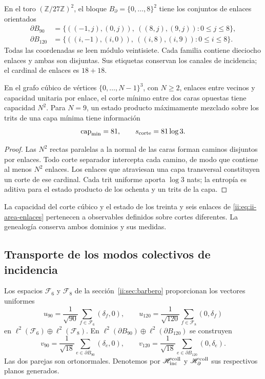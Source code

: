 En el toro \((\mathbb Z/27\mathbb Z)^2\), el bloque
\(B_\partial=\{0,\ldots,8\}^2\) tiene los conjuntos de enlaces
orientados
\begin{align}
 \partial B_{90}
 &=\{((-1,j),(0,j)),\ ((8,j),(9,j)):0\le j\le8\},\\
 \partial B_{120}
 &=\{((i,-1),(i,0)),\ ((i,8),(i,9)):0\le i\le8\}.
 \label{ii:eq:ii-area-enlaces}
\end{align}
Todas las coordenadas se leen módulo veintisiete. Cada familia contiene
dieciocho enlaces y ambas son disjuntas. Sus etiquetas conservan los
canales de incidencia; el cardinal de enlaces es \(18+18\).

\begin{theorem}
\label{ii:thm:ii-area-corte-minimo}
En el grafo cúbico de vértices \(\{0,\ldots,N-1\}^3\), con
\(N\ge2\), enlaces entre vecinos y capacidad unitaria por enlace,
el corte mínimo entre dos caras opuestas tiene capacidad \(N^2\).
Para \(N=9\), un estado producto máximamente mezclado sobre los
trits de una capa mínima tiene información
\begin{equation}
 \operatorname{cap}_{\min}=81,\qquad s_{\rm corte}=81\log3.
 \label{ii:eq:ii-area-corte-informacion}
\end{equation}
\end{theorem}
\begin{proof}
Las \(N^2\) rectas paralelas a la normal de las caras forman caminos
disjuntos por enlaces. Todo corte separador intercepta cada camino, de
modo que contiene al menos \(N^2\) enlaces. Los enlaces que atraviesan
una capa transversal constituyen un corte de ese cardinal. Cada trit
uniforme aporta \(\log3\) nats; la entropía es aditiva para el estado
producto de los ochenta y un trits de la capa.
\end{proof}

La capacidad del corte cúbico y el estado de los treinta y seis enlaces
de \eqref{ii:eq:ii-area-enlaces} pertenecen a observables definidos sobre
cortes diferentes. La genealogía conserva ambos dominios y sus medidas.

\subsection{Transporte de los modos colectivos de incidencia}
\label{ii:sec:ii-area-transporte-colectivo}

Los espacios \(\mathcal F_6\) y \(\mathcal F_8\) de la
sección~\ref{ii:sec:barbero} proporcionan los vectores uniformes
\[
 u_{90}=\frac1{\sqrt{90}}\sum_{f\in\mathcal F_6}(\delta_f,0),
 \qquad
 u_{120}=\frac1{\sqrt{120}}\sum_{f\in\mathcal F_8}(0,\delta_f)
\]
en \(\ell^2(\mathcal F_6)\oplus\ell^2(\mathcal F_8)\).
En \(\ell^2(\partial B_{90})\oplus\ell^2(\partial B_{120})\)
se construyen
\[
 v_{90}=\frac1{\sqrt{18}}\sum_{e\in\partial B_{90}}(\delta_e,0),
 \qquad
 v_{120}=\frac1{\sqrt{18}}\sum_{e\in\partial B_{120}}(0,\delta_e).
\]
Las dos parejas son ortonormales. Denotemos por
\(\mathscr H_{\rm inc}^{\rm coll}\) y
\(\mathscr H_\partial^{\rm coll}\) sus respectivos planos generados.

